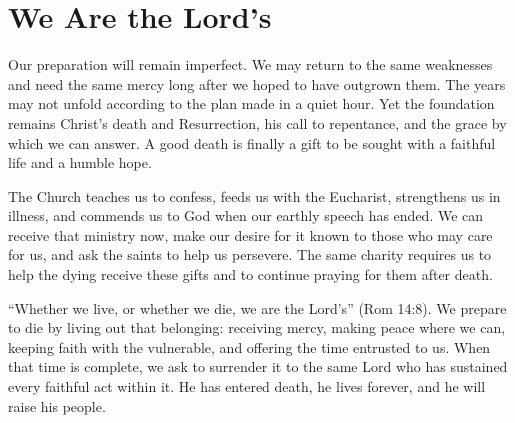 \section{We Are the Lord's}

Our preparation will remain imperfect. We may return to the same weaknesses and need the same mercy long after we hoped to have outgrown them. The years may not unfold according to the plan made in a quiet hour. Yet the foundation remains Christ's death and Resurrection, his call to repentance, and the grace by which we can answer. A good death is finally a gift to be sought with a faithful life and a humble hope.

The Church teaches us to confess, feeds us with the Eucharist, strengthens us in illness, and commends us to God when our earthly speech has ended. We can receive that ministry now, make our desire for it known to those who may care for us, and ask the saints to help us persevere. The same charity requires us to help the dying receive these gifts and to continue praying for them after death.

``Whether we live, or whether we die, we are the Lord's'' (Rom 14:8). We prepare to die by living out that belonging: receiving mercy, making peace where we can, keeping faith with the vulnerable, and offering the time entrusted to us. When that time is complete, we ask to surrender it to the same Lord who has sustained every faithful act within it. He has entered death, he lives forever, and he will raise his people.

